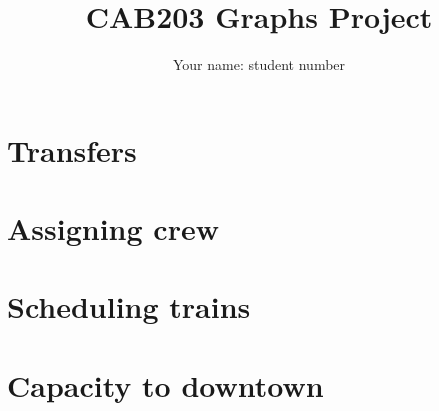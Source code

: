 \documentclass[a4paper]{article}
\author{Your name: student number}
\title{CAB203 Graphs Project}
\begin{document}
\maketitle

\section{Transfers}

\section{Assigning crew}

\section{Scheduling trains}

\section{Capacity to downtown}


\begin{thebibliography}{9}

\end{thebibliography}
\end{document}
